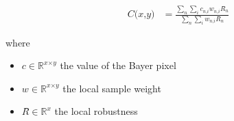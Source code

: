 \documentclass[12pt]{article}
\begin{document}
\begin{align*}
\textit{C(x,y)} & = \frac{\sum_\textit{n} \sum_\textit{i} \textit{c}_{\textit{n}, \textit{i}}\textit{w}_{\textit{n}, \textit{i}}\textit{R̂}_{ \textit{n} }}{\sum_\textit{n} \sum_\textit{i} \textit{w}_{\textit{n}, \textit{i}}\textit{R̂}_{ \textit{n} }}
\end{align*}

where
\begin{itemize}
\item $\textit{c} \in \mathbb{R}^{ \textit{x} \times \textit{y} }$ the value of the Bayer pixel
\item $\textit{w} \in \mathbb{R}^{ \textit{x} \times \textit{y} }$ the local sample weight
\item $\textit{R̂} \in \mathbb{R}^{ \textit{x}}$ the local robustness
\end{itemize}
\end{document}
